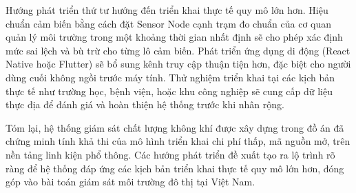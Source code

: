 \documentclass[../DoAn.tex]{subfiles}
\begin{document}
Hướng phát triển thứ tư hướng đến triển khai thực tế quy mô lớn hơn. Hiệu chuẩn cảm biến bằng cách đặt Sensor Node cạnh trạm đo chuẩn của cơ quan quản lý môi trường trong một khoảng thời gian nhất định sẽ cho phép xác định mức sai lệch và bù trừ cho từng lô cảm biến. Phát triển ứng dụng di động (React Native hoặc Flutter) sẽ bổ sung kênh truy cập thuận tiện hơn, đặc biệt cho người dùng cuối không ngồi trước máy tính. Thử nghiệm triển khai tại các kịch bản thực tế như trường học, bệnh viện, hoặc khu công nghiệp sẽ cung cấp dữ liệu thực địa để đánh giá và hoàn thiện hệ thống trước khi nhân rộng.

Tóm lại, hệ thống giám sát chất lượng không khí được xây dựng trong đồ án đã chứng minh tính khả thi của mô hình triển khai chi phí thấp, mã nguồn mở, trên nền tảng linh kiện phổ thông. Các hướng phát triển đề xuất tạo ra lộ trình rõ ràng để hệ thống đáp ứng các kịch bản triển khai thực tế quy mô lớn hơn, đóng góp vào bài toán giám sát môi trường đô thị tại Việt Nam.
\end{document}
